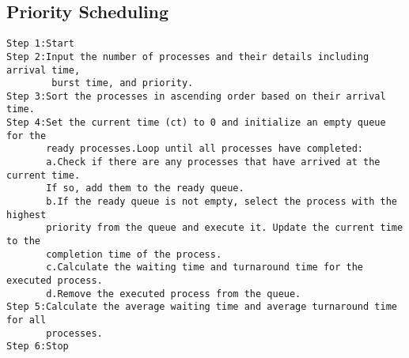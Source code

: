 \documentclass{article}
\begin{document}
\subsection{Priority Scheduling}
\begin{Verbatim}[tabsize = 4]
Step 1:Start
Step 2:Input the number of processes and their details including arrival time,
        burst time, and priority.
Step 3:Sort the processes in ascending order based on their arrival time.
Step 4:Set the current time (ct) to 0 and initialize an empty queue for the 
       ready processes.Loop until all processes have completed:
       a.Check if there are any processes that have arrived at the current time.
       If so, add them to the ready queue.
       b.If the ready queue is not empty, select the process with the highest 
       priority from the queue and execute it. Update the current time to the 
       completion time of the process.
       c.Calculate the waiting time and turnaround time for the executed process.
       d.Remove the executed process from the queue.
Step 5:Calculate the average waiting time and average turnaround time for all 
       processes.
Step 6:Stop
\end{Verbatim}
\end{document}
